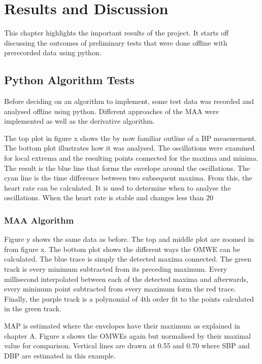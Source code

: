 \chapter{Results and Discussion}\label{cp:res}
This chapter highlights the important results of the project. It starts off discussing the outcomes of preliminary tests that were done offline with prerecorded data using python.


\section{Python Algorithm Tests}
Before deciding on an algorithm to implement, some test data was recorded and analysed offline using python. Different approaches of the MAA were implemented as well as the derivative algorithm.

The top plot in figure x shows the by now familiar outline of a BP measurement. The bottom plot illustrates how it was analysed. The oscillations were examined for local extrema and the resulting points connected for the maxima and minima. The result is the blue line that forms the envelope around the oscillations. The cyan line is the time difference between two subsequent maxima. From this, the heart rate can be calculated. It is used to determine when to analyse the oscillations. When the heart rate is stable and changes less than 20 %

\subsection{MAA Algorithm}

Figure y shows the same data as before. The top and middle plot are zoomed in from figure x. The bottom plot shows the different ways the OMWE can be calculated. The blue trace is simply the detected maxima connected. The green track is every minimum subtracted from its preceding maximum. Every millisecond interpolated between each of the detected maxima and afterwards, every minimum point subtracted from every maximum form the red trace. Finally, the purple track is a polynomial of 4th order fit to the points calculated in the green track. 

MAP is estimated where the envelopes have their maximum as explained in chapter A. Figure z shows the OMWEs again but normalised by their maximal value for comparison. Vertical lines are drawn at 0.55 and 0.70 where SBP and DBP are estimated in this example.

